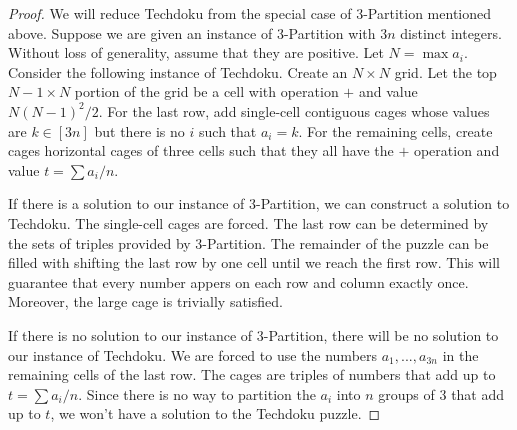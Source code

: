 \documentclass[runningheads,a4paper]{llncs}
\begin{document}
\begin{proof}
We will reduce Techdoku from the special case of 3-Partition mentioned above. Suppose we are given an instance of 3-Partition with $3n$ distinct integers. Without loss of generality, assume that they are positive. Let $N = \max a_i$. Consider the following instance of Techdoku. Create an $N \times N$ grid. Let the top $N-1 \times N$ portion of the grid be a cell with operation $+$ and value $N(N-1)^2/2$. For the last row, add single-cell contiguous cages whose values are $k \in [3n]$ but there is no $i$ such that $a_i = k$. For the remaining cells, create cages horizontal cages of three cells such that they all have the $+$ operation and value $t = \sum a_i /n$.

If there is a solution to our instance of 3-Partition, we can construct a solution to Techdoku. The single-cell cages are forced. The last row can be determined by the sets of triples provided by 3-Partition. The remainder of the puzzle can be filled with shifting the last row by one cell until we reach the first row. This will guarantee that every number appers on each row and column exactly once. Moreover, the large cage is trivially satisfied. 

If there is no solution to our instance of 3-Partition, there will be no solution to our instance of Techdoku. We are forced to use the numbers $a_1, ... ,a_{3n}$ in the remaining cells of the last row. The cages are triples of numbers that add up to $t = \sum a_i/n$. Since there is no way to partition the $a_i$ into $n$ groups of 3 that add up to $t$, we won't have a solution to the Techdoku puzzle. 
\end{proof}
\end{document}

